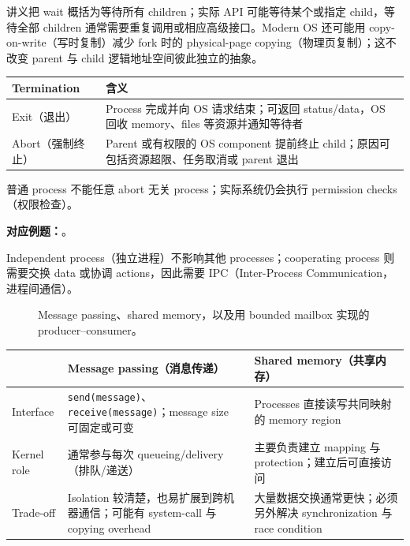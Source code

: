 讲义把 wait 概括为等待所有 children；实际 API 可能等待某个或指定 child，等待全部 children 通常需要重复调用或相应高级接口。Modern OS 还可能用 copy-on-write（写时复制）减少 fork 时的 physical-page copying（物理页复制）；这不改变 parent 与 child 逻辑地址空间彼此独立的抽象。

\begin{center}
\small
\begin{tabularx}{0.96\textwidth}{@{}>{\raggedright\arraybackslash}p{2.7cm}X@{}}
  \toprule
  Termination & 含义 \\
  \midrule
  Exit（退出） & Process 完成并向 OS 请求结束；可返回 status/data，OS 回收 memory、files 等资源并通知等待者 \\
  Abort（强制终止） & Parent 或有权限的 OS component 提前终止 child；原因可包括资源超限、任务取消或 parent 退出 \\
  \bottomrule
\end{tabularx}
\end{center}

普通 process 不能任意 abort 无关 process；实际系统仍会执行 permission checks（权限检查）。

\textbf{对应例题：}。


Independent process（独立进程）不影响其他 processes；cooperating process 则需要交换 data 或协调 actions，因此需要 IPC（Inter-Process Communication，进程间通信）。

\begin{figure}[htbp]
  \centering
  \resizebox{0.98\textwidth}{!}{}
  \caption{Message passing、shared memory，以及用 bounded mailbox 实现的 producer--consumer。}
  \label{fig:sc2005-l04-ipc-models}
\end{figure}

\begin{center}
\small
\begin{tabularx}{\textwidth}{@{}>{\raggedright\arraybackslash}p{3.0cm}XX@{}}
  \toprule
  & Message passing（消息传递） & Shared memory（共享内存） \\
  \midrule
  Interface & \texttt{send(message)}、\texttt{receive(message)}；message size 可固定或可变 & Processes 直接读写共同映射的 memory region \\
  Kernel role & 通常参与每次 queueing/delivery（排队/递送） & 主要负责建立 mapping 与 protection；建立后可直接访问 \\
  Trade-off & Isolation 较清楚，也易扩展到跨机器通信；可能有 system-call 与 copying overhead & 大量数据交换通常更快；必须另外解决 synchronization 与 race condition \\
  \bottomrule
\end{tabularx}
\end{center}

